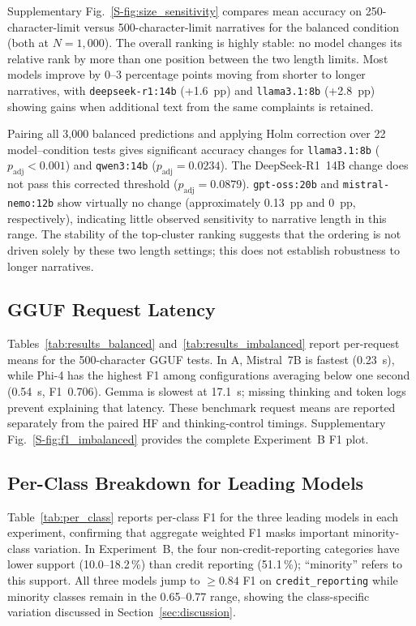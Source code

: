 \documentclass[pdflatex,sn-mathphys-num]{sn-jnl}
\begin{document}
Supplementary Fig.~\ref{S-fig:size_sensitivity} compares mean accuracy on
250-character-limit versus 500-character-limit narratives for the
balanced condition (both at $N{=}1{,}000$). The overall ranking
is highly stable: no model changes its relative rank by more than
one position between the two length limits. Most models improve by
0--3 percentage points moving from shorter to longer narratives, with
\texttt{deepseek-r1:14b} (+1.6~pp) and \texttt{llama3.1:8b} (+2.8~pp)
showing gains when additional text from the same complaints is retained.

Pairing all 3,000 balanced predictions and applying Holm correction
over 22 model--condition tests gives significant accuracy changes for
\texttt{llama3.1:8b} ($p_{\mathrm{adj}}<0.001$) and
\texttt{qwen3:14b} ($p_{\mathrm{adj}}=0.0234$).
The DeepSeek-R1~14B change does not pass this corrected threshold
($p_{\mathrm{adj}}=0.0879$).
\texttt{gpt-oss:20b} and \texttt{mistral-nemo:12b} show virtually no
change (approximately 0.13~pp and 0~pp, respectively), indicating little observed sensitivity
to narrative length in this range. The stability of the top-cluster
ranking suggests that the ordering is not driven solely by these two
length settings; this does not establish robustness to longer narratives.



\subsection{GGUF Request Latency}

Tables~\ref{tab:results_balanced} and~\ref{tab:results_imbalanced}
report per-request means for the 500-character GGUF tests. In A,
Mistral~7B is fastest (0.23~s),
while Phi-4 has the highest F1 among configurations averaging below
one second (0.54~s, F1~0.706). Gemma is slowest at 17.1~s;
missing thinking and token logs prevent explaining that latency.
These benchmark request means are reported separately from the
paired HF and thinking-control timings. Supplementary Fig.~\ref{S-fig:f1_imbalanced}
provides the complete Experiment~B F1 plot.

\subsection{Per-Class Breakdown for Leading Models}
\label{sec:per_class_metrics}

Table~\ref{tab:per_class} reports per-class F1 for the three leading
models in each experiment, confirming that aggregate weighted F1 masks
important minority-class variation. In Experiment~B, the four
non-credit-reporting categories have lower support (10.0--18.2\,\%)
than credit reporting (51.1\,\%); ``minority'' refers to this support.
All three models
jump to ${\geq}0.84$ F1 on \texttt{credit\_reporting} while minority
classes remain in the 0.65--0.77 range, showing the class-specific variation discussed in Section~\ref{sec:discussion}.
\end{document}

